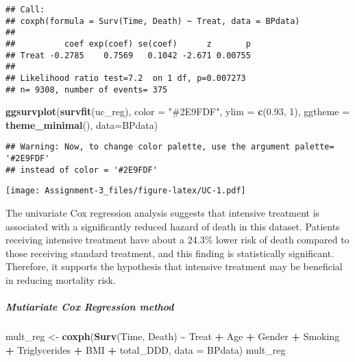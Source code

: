 \documentclass[
]{article}
\newenvironment{Shaded}{\begin{snugshade}}{\end{snugshade}}
\newcommand{\AttributeTok}[1]{\textcolor[rgb]{0.13,0.29,0.53}{#1}}
\newcommand{\DecValTok}[1]{\textcolor[rgb]{0.00,0.00,0.81}{#1}}
\newcommand{\FloatTok}[1]{\textcolor[rgb]{0.00,0.00,0.81}{#1}}
\newcommand{\FunctionTok}[1]{\textcolor[rgb]{0.13,0.29,0.53}{\textbf{#1}}}
\newcommand{\NormalTok}[1]{#1}
\newcommand{\OtherTok}[1]{\textcolor[rgb]{0.56,0.35,0.01}{#1}}
\newcommand{\SpecialCharTok}[1]{\textcolor[rgb]{0.81,0.36,0.00}{\textbf{#1}}}
\newcommand{\StringTok}[1]{\textcolor[rgb]{0.31,0.60,0.02}{#1}}
\begin{document}
\begin{verbatim}
## Call:
## coxph(formula = Surv(Time, Death) ~ Treat, data = BPdata)
## 
##          coef exp(coef) se(coef)      z       p
## Treat -0.2785    0.7569   0.1042 -2.671 0.00755
## 
## Likelihood ratio test=7.2  on 1 df, p=0.007273
## n= 9308, number of events= 375
\end{verbatim}

\begin{Shaded}
\begin{Highlighting}[]
\FunctionTok{ggsurvplot}\NormalTok{(}\FunctionTok{survfit}\NormalTok{(uc\_reg), }\AttributeTok{color =} \StringTok{"\#2E9FDF"}\NormalTok{,}
           \AttributeTok{ylim =} \FunctionTok{c}\NormalTok{(}\FloatTok{0.93}\NormalTok{, }\DecValTok{1}\NormalTok{),}
           \AttributeTok{ggtheme =} \FunctionTok{theme\_minimal}\NormalTok{(), }\AttributeTok{data=}\NormalTok{BPdata)}
\end{Highlighting}
\end{Shaded}

\begin{verbatim}
## Warning: Now, to change color palette, use the argument palette= '#2E9FDF'
## instead of color = '#2E9FDF'
\end{verbatim}

\texttt{[image: Assignment-3\_files/figure-latex/UC-1.pdf]}

The univariate Cox regression analysis suggests that intensive treatment
is associated with a significantly reduced hazard of death in this
dataset. Patients receiving intensive treatment have about a 24.3\%
lower risk of death compared to those receiving standard treatment, and
this finding is statistically significant. Therefore, it supports the
hypothesis that intensive treatment may be beneficial in reducing
mortality risk.

\newpage

\subparagraph{Mutiariate Cox Regression
method}\label{mutiariate-cox-regression-method}

\begin{Shaded}
\begin{Highlighting}[]
\NormalTok{mult\_reg }\OtherTok{\textless{}{-}} \FunctionTok{coxph}\NormalTok{(}\FunctionTok{Surv}\NormalTok{(Time, Death) }\SpecialCharTok{\textasciitilde{}}\NormalTok{ Treat }\SpecialCharTok{+}\NormalTok{ Age }\SpecialCharTok{+}\NormalTok{ Gender }\SpecialCharTok{+}\NormalTok{ Smoking }\SpecialCharTok{+}\NormalTok{ Triglycerides }\SpecialCharTok{+}\NormalTok{ BMI }\SpecialCharTok{+}\NormalTok{ total\_DDD, }\AttributeTok{data =}\NormalTok{ BPdata)}
\NormalTok{mult\_reg}
\end{Highlighting}
\end{Shaded}
\end{document}
